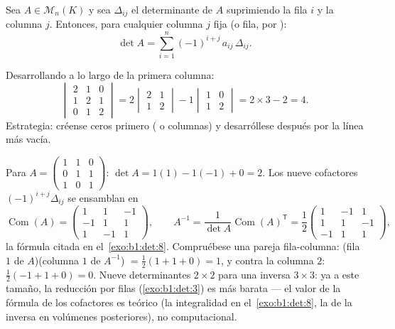 \begin{theorem}\label{thm:b1:det:cofactor}
Sea $A \in \mathcal{M}_n(K)$ y sea $\Delta_{ij}$ el determinante de
$A$ suprimiendo la fila $i$ y la columna $j$. Entonces, para
cualquier columna $j$ fija (o fila, por
):
\[
\det A = \sum_{i=1}^{n} (-1)^{i+j}\, a_{ij}\, \Delta_{ij} .
\]
\end{theorem}
\admitted

\begin{example}\label{ex:b1:det:cofactor}
Desarrollando a lo largo de la primera columna:
\[
\begin{vmatrix}
2 & 1 & 0\\
1 & 2 & 1\\
0 & 1 & 2
\end{vmatrix}
= 2\begin{vmatrix} 2 & 1\\ 1 & 2\end{vmatrix}
- 1\begin{vmatrix} 1 & 0\\ 1 & 2\end{vmatrix}
= 2 \times 3 - 2 = 4 .
\]
Estrategia: créense ceros primero ( o columnas)
y desarróllese después por la línea más vacía.
\end{example}

\begin{example}
\label{ex:b1:det:cofactorinverse}
Para $A = \begin{pmatrix} 1 & 1 & 0\\ 0 & 1 & 1\\ 1 & 0 &
1\end{pmatrix}$: $\det A = 1(1) - 1(-1) + 0 = 2$. Los nueve
cofactores $(-1)^{i+j}\Delta_{ij}$ se ensamblan en
\[
\operatorname{Com}(A) = \begin{pmatrix}
1 & 1 & -1\\
-1 & 1 & 1\\
1 & -1 & 1
\end{pmatrix},
\qquad
A^{-1} = \frac{1}{\det A}\operatorname{Com}(A)^{\mathsf T}
= \frac12\begin{pmatrix}
1 & -1 & 1\\
1 & 1 & -1\\
-1 & 1 & 1
\end{pmatrix},
\]
la fórmula citada en el~\cref{exo:b1:det:8}. Compruébese una pareja
fila-columna: (fila $1$ de $A$)(columna $1$ de $A^{-1}$)
$= \frac12(1 + 1 + 0) = 1$, y contra la columna $2$:
$\frac12(-1 + 1 + 0) = 0$. Nueve determinantes $2\times2$ para una
inversa $3\times3$: ya a este tamaño, la reducción por filas
(\cref{exo:b1:det:3}) es más barata --- el valor de la fórmula de los
cofactores es teórico (la integralidad en el~\cref{exo:b1:det:8}, la
 de la inversa en volúmenes posteriores), no
computacional.
\end{example}

